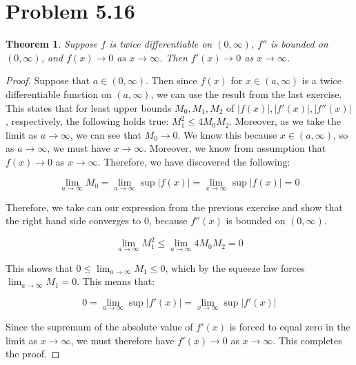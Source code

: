 \documentclass[psamsfonts]{amsart}
\newtheorem{thm}{Theorem}[section]
\theoremstyle{definition}
\theoremstyle{remark}
\numberwithin{equation}{section}
\begin{document}
\section{Problem 5.16}

\begin{thm}
Suppose $f$ is twice differentiable on $(0,\infty)$, $f''$ is bounded on $(0,\infty)$, and $f(x) \to 0$ as $x \to \infty$. Then $f'(x) \to 0$ as $x \to \infty$. 
\end{thm}

\begin{proof}
Suppose that $a \in (0,\infty)$. Then since $f(x)$ for $x \in (a,\infty)$ is a twice differentiable function on $(a,\infty)$, we can use the result from the last exercise. This states that for least upper bounds $M_0, M_1, M_2$ of $|f(x)|,|f'(x)|,|f''(x)|$, respectively, the following holds true: $M_1^2 \leq 4 M_0 M_2$. Moreover, as we take the limit as $a \to \infty$, we can see that $M_0 \to 0$. We know this because $x \in (a, \infty)$, so as $a \to \infty$, we must have $x \to \infty$. Moreover, we know from assumption that $f(x) \to 0$ as $x \to \infty$. Therefore, we have discovered the following:

\begin{equation}
\lim_{a \to \infty} M_0 = \lim_{a \to \infty} \sup | f(x) | = \lim_{x \to \infty} \sup |f(x)| = 0 
\end{equation}

Therefore, we take can our expression from the previous exercise and show that the right hand side converges to 0, because $f''(x)$ is bounded on $(0, \infty)$.

\begin{equation}
\lim_{a \to \infty} M_1^2 \leq \lim_{a \to \infty} 4 M_0 M_2 = 0
\end{equation}

This shows that $0 \leq \lim_{a \to \infty} M_1 \leq 0$, which by the squeeze law forces $\lim_{a \to \infty} M_1 = 0$. This means that:

\begin{equation}
0 = \lim_{a \to \infty} \sup|f'(x)| = \lim_{x \to \infty} \sup |f'(x)| 
\end{equation}

Since the supremum of the absolute value of $f'(x)$ is forced to equal zero in the limit as $x \to \infty$, we must therefore have $f'(x) \to 0$ as $x \to \infty$. This completes the proof.

\end{proof}
\end{document}
